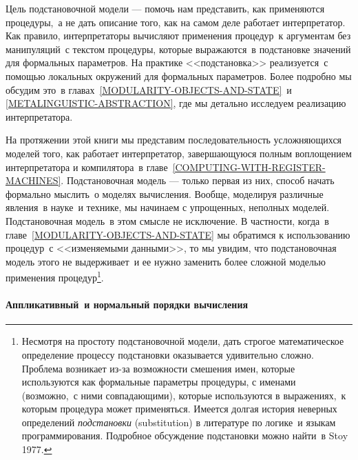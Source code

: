 \begin{plainlist}


\item
Цель подстановочной модели --- помочь нам
представить, как применяются процедуры,~а не дать описание того, как на самом
деле работает интерпретатор.  Как правило, интерпретаторы вычисляют
применения процедур~к аргументам без манипуляций~с текстом
процедуры, которые выражаются~в подстановке значений для формальных
параметров.  На практике <<подстановка>> реализуется~с помощью
локальных окружений для формальных параметров.  Более
подробно мы обсудим это~в главах~\ref{MODULARITY-OBJECTS-AND-STATE}~и \ref{METALINGUISTIC-ABSTRACTION}, где мы
детально исследуем реализацию интерпретатора.

\item
На протяжении этой книги мы представим
последовательность усложняющихся моделей того, как работает
интерпретатор, завершающуюся полным воплощением интерпретатора и
компилятора~в главе~\ref{COMPUTING-WITH-REGISTER-MACHINES}.
Подстановочная модель --- только первая 
из них, способ начать формально мыслить~о моделях вычисления.  Вообще,
моделируя  
различные явления~в науке~и технике, мы начинаем с
упрощенных, неполных моделей.  Подстановочная модель~в этом смысле не
исключение. В частности, когда~в главе~\ref{MODULARITY-OBJECTS-AND-STATE} мы обратимся 
к использованию процедур~с <<изменяемыми данными>>, то мы увидим, что
подстановочная модель этого не выдерживает~и ее нужно заменить более
сложной моделью применения процедур\footnote{Несмотря на простоту подстановочной модели,
дать строгое математическое определение процессу подстановки
оказывается удивительно сложно.  Проблема возникает из-за возможности
смешения имен, которые используются как формальные параметры процедуры,
с именами (возможно,~с ними совпадающими), которые используются в
выражениях,~к которым процедура может применяться.  Имеется долгая
история неверных определений
{\em подстановки} (substitution) в
литературе по логике~и языкам программирования. Подробное обсуждение
подстановки можно найти~в Stoy 1977.
}.
\end{plainlist}

\paragraph{Аппликативный~и нормальный порядки вычисления}


